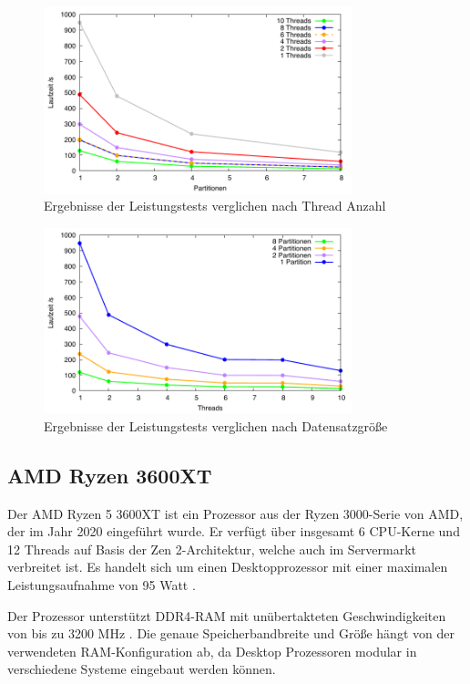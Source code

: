 \begin{figure}[H]
\centering
\includegraphics[width=0.8\textwidth]{../results/plots/m1pro/comp_all_threads.pdf}
\caption{Ergebnisse der Leistungstests verglichen nach Thread Anzahl}
\label{fig:m1pro_benchmark_threads}
\end{figure}

\begin{figure}[htbp!]
\centering
\includegraphics[width=0.8\textwidth]{../results/plots/m1pro/comp_all_partitions.pdf}
\caption{Ergebnisse der Leistungstests verglichen nach Datensatzgröße}
\label{fig:m1pro_benchmark_partitions}
\end{figure}

\subsection{AMD Ryzen 3600XT}
Der AMD Ryzen 5 3600XT ist ein Prozessor aus der Ryzen 3000-Serie von AMD, der im Jahr 2020 eingeführt wurde. Er verfügt über insgesamt 6 CPU-Kerne und 12 Threads auf Basis der Zen 2-Architektur, welche auch im Servermarkt verbreitet ist. Es handelt sich um einen Desktopprozessor mit einer maximalen Leistungsaufnahme von 95 Watt \citep{Ryzen_Technische_Daten}.

Der Prozessor unterstützt DDR4-RAM mit unübertakteten Geschwindigkeiten von bis zu 3200 MHz \citep{Ryzen_Technische_Daten}. Die genaue Speicherbandbreite und Größe hängt von der verwendeten RAM-Konfiguration ab, da Desktop Prozessoren modular in verschiedene Systeme eingebaut werden können.

